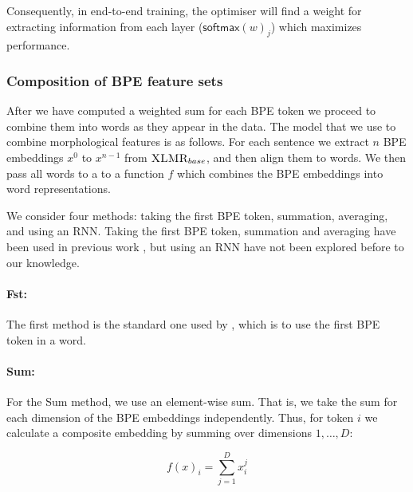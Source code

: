 \documentclass[11pt]{article}
\newcommand\jp[1]{(\textbf{JP:} #1)}
\newcommand\citet{\newcite}
\newcommand\citep{\cite}
\newcommand\softmax{\mathsf{softmax}}
\begin{document}
        Consequently, in end-to-end training, the optimiser will find
        a weight for extracting information from each layer
        ($\softmax(w)_j$) which maximizes performance.

     \subsubsection{Composition of BPE feature sets}
          After we have computed a weighted sum for each BPE token we
     proceed to combine them into words as they appear in the data.
      The model that we use to combine morphological features is as
     follows. For each sentence we extract $n$ BPE embeddings $x^0$ to
     $x^{n-1}$ from $\text{\sc XLMR}_{base}$, and then align them to words.
        We then pass all words to a to a function $f$ which combines
     the BPE embeddings into word representations.
    

                    We consider four methods: taking the first BPE
     token, summation, averaging, and using an RNN. Taking the first
     BPE token, summation and averaging have been used in previous
     work \citep{sachan2020syntax,kondratyuk2019cross,devlin2018bert},
     but using an RNN have not been explored before to our knowledge.

        \paragraph{Fst:} The first method is the standard one used by
     \citet{devlin2018bert}, which is to use the first BPE token in a word.
    
    	\paragraph{Sum:} For the Sum method, we use an element-wise
     sum. That is, we take the sum for each dimension of the BPE
     embeddings independently. Thus, for token $i$ we calculate a
     composite embedding by summing over dimensions $1,\ldots,D$:
	
	\begin{equation}
	f(x)_i = \sum_{j=1}^{D} x_i^j
	\end{equation}
	
\end{document}
